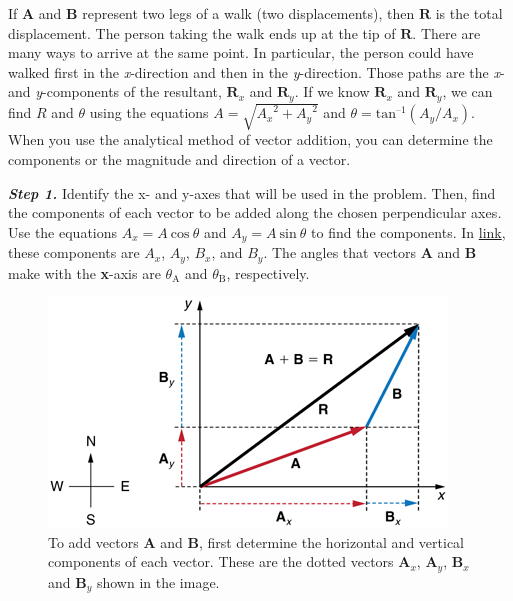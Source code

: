 \documentclass[
]{book}
\begin{document}
If \(\mathbf{A}\) and \(\mathbf{B}\) represent two legs of a walk (two
displacements), then \(\mathbf{R}\) is the total displacement. The person
taking the walk ends up at the tip of \(\mathbf{R}.\) There are many ways
to arrive at the same point. In particular, the person could have walked
first in the \emph{x}-direction and then in the \emph{y}-direction. Those paths
are the \emph{x}- and \emph{y}-components of the resultant, \(\mathbf{R}_{x}\) and
\(\mathbf{R}_{y}{}\). If we know \(\textbf{R}_{x}{}\) and
\(\mathbf{R}_{y}{}\), we can find \(R\) and \(\theta\) using the equations
\(A = \sqrt{{A_{x}}^{2} + {A_{y}}^{2}}\) and
\(\theta = \text{tan}^{–1}(A_{y}/A_{x})\). When you use the analytical
method of vector addition, you can determine the components or the
magnitude and direction of a vector.

\emph{\textbf{Step 1.} }Identify the x- and y-axes that will be used in the
problem. Then, find the components of each vector to be added along the
chosen perpendicular axes\emph{.} Use the equations
\({{A_{x} = A}\ \text{cos}\ \theta}{}\) and
\({{A_{y} = A}\ \text{sin}\ \theta}{}\) to find the components. In
\protect\hyperlink{import-auto-id1165296674934}{link}, these
components are \(A_{x}{}\), \(A_{y}{}\), \(B_{x}{}\), and \(B_{y}{}\). The
angles that vectors \(\mathbf{A}{}\) and \(\mathbf{B}{}\) make with the
\textbf{x}-axis are \(\theta_{\text{A}}{}\) and \(\theta_{\text{B}}{}\),
respectively.

\begin{figure}
\hypertarget{import-auto-id1165296674934}{%
\centering
\includegraphics{images/Figure_03_03_06a.jpg}
\caption{To add vectors \(\mathbf{A}{}\) and \(\mathbf{B}{}\), first determine the
horizontal and vertical components of each vector. These are the dotted
vectors \(\mathbf{A}_{x}{}\), \(\mathbf{A}_{y}{}\), \(\mathbf{B}_{x}{}\) and
\(\textbf{B}_{y}\) shown in the
image.}\label{import-auto-id1165296674934}
}
\end{figure}
\end{document}
